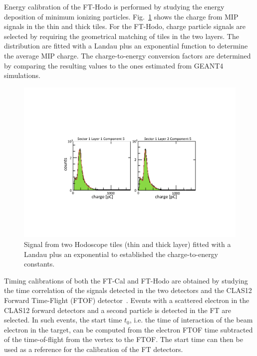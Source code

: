 Energy calibration of the FT-Hodo is performed by studying the energy deposition of minimum ionizing particles. Fig.~\ref{fig:fthodo_mips} shows the charge from MIP signals in the thin and thick tiles. For the FT-Hodo, charge particle signals are selected by requiring the geometrical matching of tiles in the two layers. The distribution are fitted with a Landau plus an exponential function to determine the average MIP charge. The charge-to-energy conversion factors are determined by comparing the resulting values to the ones estimated from GEANT4 simulations.
\begin{figure}
\includegraphics[width=1.0\columnwidth]{fig/fthodo_mips.pdf}
\caption{Signal from two Hodoscope tiles (thin and thick layer) fitted with a Landau plus an exponential to established the charge-to-energy constants.}
\label{fig:fthodo_mips}
\end{figure}

Timing calibrations of both the FT-Cal and FT-Hodo are obtained by studying the time correlation of the signals detected in the two detectors and the CLAS12 Forward Time-Flight (FTOF) detector~\cite{ftof}. Events with a scattered electron in the CLAS12 forward detectors and a second particle is detected in the FT are selected. In such events, the start time $t_0$, i.e. the time of interaction of the beam electron in the target, can be computed from the electron FTOF time subtracted of the time-of-flight from the vertex to the FTOF. The start time can then be used as a reference for the calibration of the FT detectors. 

